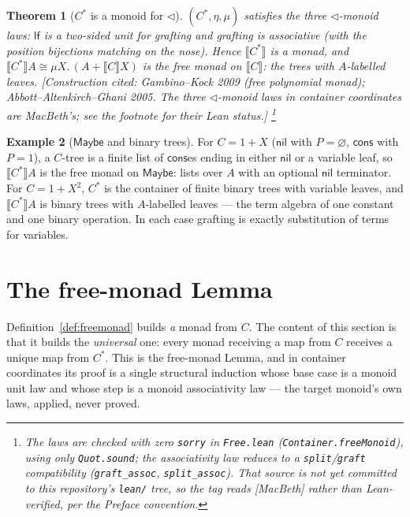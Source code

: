 \documentclass[11pt,a4paper]{book}
\newcommand{\Ext}[1]{\llbracket #1 \rrbracket}
\theoremstyle{plain}
\newtheorem{Theorem}{Theorem}[chapter]
\theoremstyle{definition}
\newtheorem{Example}[Theorem]{Example}
\theoremstyle{remark}
\newcommand{\prov}[1]{\hfill\textsf{\footnotesize[#1]}}
\begin{document}
\begin{Theorem}[$C^{*}$ is a monoid for $\triangleleft$]\label{thm:free-monoid}
$(C^{*},\eta,\mu)$ satisfies the three $\triangleleft$-monoid laws: $\mathsf{lf}$ is a
two-sided unit for grafting and grafting is associative (with the position bijections
matching on the nose). Hence $\Ext{C^{*}}$ is a monad, and
$\Ext{C^{*}}A\cong\mu X.\,(A+\Ext C X)$ is the free monad on $\Ext C$: the trees with
$A$-labelled leaves.
\prov{Construction cited: Gambino--Kock 2009 (free polynomial monad); Abbott--Altenkirch--Ghani
2005. The three $\triangleleft$-monoid laws in container coordinates are MacBeth's; see the
footnote for their Lean status.}%
\footnote{The laws are checked with zero \texttt{sorry} in \texttt{Free.lean}
(\texttt{Container.freeMonoid}), using only \texttt{Quot.sound}; the associativity law reduces
to a \texttt{split}/\texttt{graft} compatibility (\texttt{graft\_assoc}, \texttt{split\_assoc}).
That source is not yet committed to this repository's \texttt{lean/} tree, so the tag reads
\textsf{[MacBeth]} rather than \textsf{Lean-verified}, per the Preface convention.}
\end{Theorem}

\begin{Example}[$\mathsf{Maybe}$ and binary trees]\label{ex:free}
For $C=1+X$ ($\mathsf{nil}$ with $P=\varnothing$, $\mathsf{cons}$ with $P=1$), a $C$-tree is a
finite list of $\mathsf{cons}$es ending in either $\mathsf{nil}$ or a variable leaf, so
$\Ext{C^{*}}A$ is the free monad on $\mathsf{Maybe}$: lists over $A$ with an optional
$\mathsf{nil}$ terminator. For $C=1+X^{2}$, $C^{*}$ is the container of finite binary trees
with variable leaves, and $\Ext{C^{*}}A$ is binary trees with $A$-labelled leaves --- the
term algebra of one constant and one binary operation. In each case grafting is exactly
substitution of terms for variables.
\end{Example}

\section{The free-monad Lemma}
\label{sec:moncomon-lemma}

Definition~\ref{def:freemonad} builds \emph{a} monad from $C$. The content of this section is
that it builds the \emph{universal} one: every monad receiving a map from $C$ receives a
unique map from $C^{*}$. This is the free-monad Lemma, and in container coordinates its proof
is a single structural induction whose base case is a monoid unit law and whose step is a
monoid associativity law --- the target monoid's own laws, applied, never proved.
\end{document}
